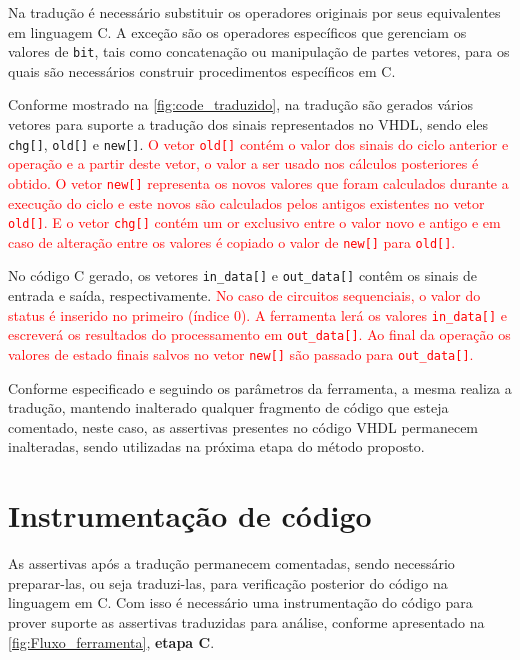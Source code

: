 \par
Na tradução é necessário substituir os operadores originais por seus equivalentes em linguagem C. A exceção são os operadores específicos que gerenciam os valores de \texttt{bit}, tais como concatenação ou manipulação de partes vetores, para os quais são necessários construir procedimentos específicos em C.

Conforme mostrado na \autoref{fig:code_traduzido}, na tradução são gerados vários vetores para suporte a tradução dos sinais representados no VHDL, sendo eles \texttt{chg[]}, \texttt{old[]} e \texttt{new[]}. \textcolor{red}{O vetor \texttt{old[]} contém o valor dos sinais do ciclo anterior e operação e a partir deste vetor, o valor a ser usado nos cálculos posteriores é obtido. O vetor \texttt{new[]} representa os novos valores que foram calculados durante a execução do ciclo e este novos são calculados pelos antigos existentes no vetor \texttt{old[]}. E o vetor \texttt{chg[]} contém um or exclusivo entre o valor novo e antigo e em caso de alteração entre os valores é copiado o valor de \texttt{new[]} para \texttt{old[]}.}

\par
No código C gerado, os vetores \texttt{in\_data[]} e \texttt{out\_data[]} contêm os sinais de entrada e saída, respectivamente. \textcolor{red}{No caso de circuitos sequenciais, o valor do status é inserido no primeiro (índice 0). A ferramenta lerá os valores \texttt{in\_data[]} e escreverá os resultados do processamento em \texttt{out\_data[]}. Ao final da operação os valores de estado finais salvos no vetor \texttt{new[]} são passado para \texttt{out\_data[]}.}

\par
Conforme especificado e seguindo os parâmetros da ferramenta, a mesma realiza a tradução, mantendo inalterado qualquer fragmento de código que esteja comentado, neste caso, as assertivas presentes no código VHDL permanecem inalteradas, sendo utilizadas na próxima etapa do método proposto.

\section{Instrumentação de código}

\par
As assertivas após a tradução permanecem comentadas, sendo necessário preparar-las, ou seja traduzi-las, para verificação posterior do código na linguagem em C. Com isso é necessário uma instrumentação do código para prover suporte as assertivas traduzidas para análise, conforme apresentado na \autoref{fig:Fluxo_ferramenta}, \textbf{etapa C}.

